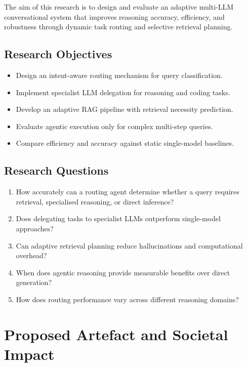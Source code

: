 \documentclass[12pt,a4paper]{article}
\begin{document}
The aim of this research is to design and evaluate an adaptive multi-LLM conversational system that improves reasoning accuracy, efficiency, and robustness through dynamic task routing and selective retrieval planning.

\subsection{Research Objectives}

\begin{itemize}
    \item Design an intent-aware routing mechanism for query classification.
    \item Implement specialist LLM delegation for reasoning and coding tasks.
    \item Develop an adaptive RAG pipeline with retrieval necessity prediction.
    \item Evaluate agentic execution only for complex multi-step queries.
    \item Compare efficiency and accuracy against static single-model baselines.
\end{itemize}

\subsection{Research Questions}

\begin{enumerate}
    \item How accurately can a routing agent determine whether a query requires retrieval, specialised reasoning, or direct inference?
    \item Does delegating tasks to specialist LLMs outperform single-model approaches?
    \item Can adaptive retrieval planning reduce hallucinations and computational overhead?
    \item When does agentic reasoning provide measurable benefits over direct generation?
    \item How does routing performance vary across different reasoning domains?
\end{enumerate}


\section{Proposed Artefact and Societal Impact}
\end{document}
